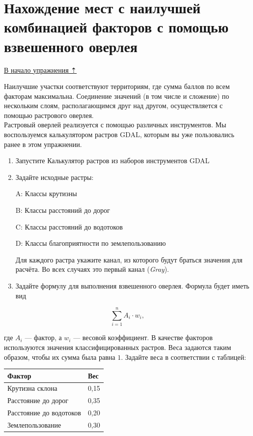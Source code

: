 \documentclass[
  12pt,
]{book}
\begin{document}
\hypertarget{weighted-overlay-combination}{%
\section{Нахождение мест с наилучшей комбинацией факторов с помощью взвешенного оверлея}\label{weighted-overlay-combination}}

\protect\hyperlink{weighted-overlay}{В начало упражнения ⇡}

Наилучшие участки соответствуют территориям, где сумма баллов по всем факторам максимальна. Соединение значений (в том числе и сложение) по нескольким слоям, располагающимся друг над другом, осуществляется с помощью растрового оверлея.\\
Растровый оверлей реализуется с помощью различных инструментов. Мы воспользуемся калькулятором растров GDAL, которым вы уже пользовались ранее в этом упражнении.

\begin{enumerate}
\def\labelenumi{\arabic{enumi}.}
\item
  Запустите Калькулятор растров из наборов инструментов GDAL
\item
  Задайте исходные растры:

  A: Классы крутизны

  B: Классы расстояний до дорог

  C: Классы расстояний до водотоков

  D: Классы благоприятности по землепользованию

  Для каждого растра укажите канал, из которого будут браться значения для расчёта. Во всех случаях это первый канал (\emph{Gray}).
\item
  Задайте формулу для выполнения взвешенного оверлея. Формула будет иметь вид
\end{enumerate}

\[\sum_{i=1}^n A_i \cdot w_i,\]

где \(A_i\) --- фактор, а \(w_i\) --- весовой коэффициент. В качестве факторов используются значения классифицированных растров. Веса задаются таким образом, чтобы их сумма была равна \(1\). Задайте веса в соответствии с таблицей:

\begin{longtable}[]{@{}ll@{}}
\toprule
Фактор & Вес \\
\midrule
\endhead
Крутизна склона & 0,15 \\
Расстояние до дорог & 0,35 \\
Расстояние до водотоков & 0,20 \\
Землепользование & 0,30 \\
\bottomrule
\end{longtable}
\end{document}
